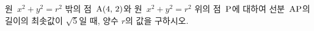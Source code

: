 원~$x^2+y^2=r^2$ 밖의 점~$\mathrm{A}(4,\mkern3mu 2)$와 원~$x^2+y^2=r^2$ 위의 점~$\mathrm{P}$에 대하여 선분~$\mathrm{AP}$의 길이의 최솟값이 $\sqrt{5}$일 때, 양수 $r$의 값을 구하시오.
